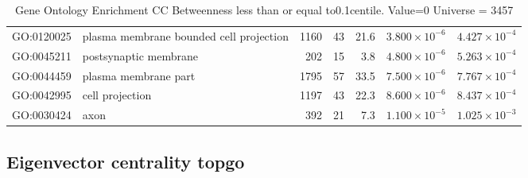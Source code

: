 \begin{table}[ht]
\begin{adjustbox}{width=\textwidth}
\begin{tabular}{llrrrrr}
  GO:0120025 & plasma membrane bounded cell projection & 1160 & 43 & 21.6 & $3.800 \times 10^{-6}$ & $4.427 \times 10^{-4}$ \\ 
  GO:0045211 & postsynaptic membrane & 202 & 15 & 3.8 & $4.800 \times 10^{-6}$ & $5.263 \times 10^{-4}$ \\ 
  GO:0044459 & plasma membrane part & 1795 & 57 & 33.5 & $7.500 \times 10^{-6}$ & $7.767 \times 10^{-4}$ \\ 
  GO:0042995 & cell projection & 1197 & 43 & 22.3 & $8.600 \times 10^{-6}$ & $8.437 \times 10^{-4}$ \\ 
  GO:0030424 & axon & 392 & 21 & 7.3 & $1.100 \times 10^{-5}$ & $1.025 \times 10^{-3}$ \\ 
   \hline
\end{tabular}
\end{adjustbox}
\caption{Gene Ontology Enrichment CC Betweenness  less than or equal to0.1centile.   Value=0 Universe = 3457} 
\label{tab:Gene Ontology Enrichment CC Betweenness  less than or equal to0.1centile.   Value=0 Universe = 3457}
\end{table}



\subsection{Eigenvector centrality topgo}
